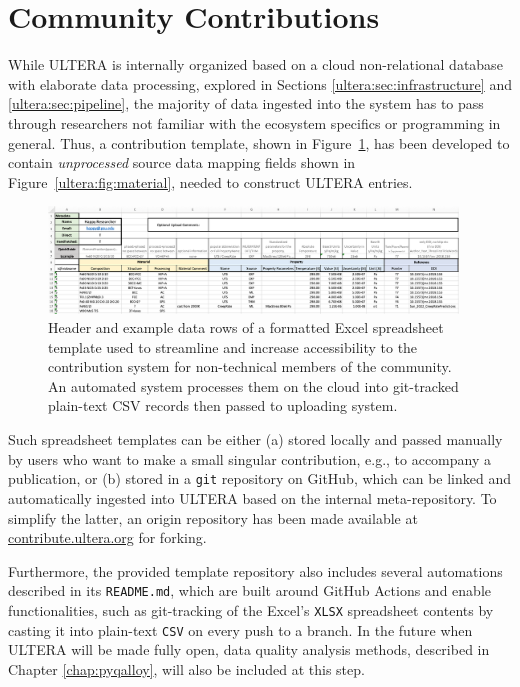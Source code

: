 \section{Community Contributions} \label{ultera:sec:contributions}

While ULTERA is internally organized based on a cloud non-relational database with elaborate data processing, explored in Sections \ref{ultera:sec:infrastructure} and \ref{ultera:sec:pipeline}, the majority of data ingested into the system has to pass through researchers not familiar with the ecosystem specifics or programming in general. Thus, a contribution template, shown in Figure~\ref{ultera:fig:contributiontemplate}, has been developed to contain \emph{unprocessed} source data mapping fields shown in Figure~\ref{ultera:fig:material}, needed to construct ULTERA entries.

\begin{figure}[H]
    \centering
    \includegraphics[width=0.97\textwidth]{ultera/ULTERA_Contribute.png}
    \caption{Header and example data rows of a formatted Excel spreadsheet template used to streamline and increase accessibility to the contribution system for non-technical members of the community. An automated system processes them on the cloud into git-tracked plain-text CSV records then passed to uploading system.}
    \label{ultera:fig:contributiontemplate}
\end{figure}

Such spreadsheet templates can be either (a) stored locally and passed manually by users who want to make a small singular contribution, e.g., to accompany a publication, or (b) stored in a \texttt{git} repository on GitHub, which can be linked and automatically ingested into ULTERA based on the internal meta-repository. To simplify the latter, an origin repository has been made available at \href{http://contribute.ultera.org/}{contribute.ultera.org} for forking.

Furthermore, the provided template repository also includes several automations described in its \texttt{README.md}, which are built around GitHub Actions and enable functionalities, such as git-tracking of the Excel's \texttt{XLSX} spreadsheet contents by casting it into plain-text \texttt{CSV} on every push to a branch. In the future when ULTERA will be made fully open, data quality analysis methods, described in Chapter \ref{chap:pyqalloy}, will also be included at this step.


